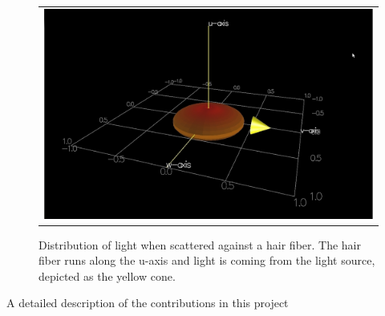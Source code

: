 \documentclass[11pt,a4paper]{report}
\begin{document}
\begin{figure}
\begin{tabular}{c}
\includegraphics[scale=0.2]{images/strands1_colorR.jpg} \\
\end{tabular}

\caption{Distribution of light when scattered against a hair fiber. The hair fiber runs along the u-axis and light is coming from the light source, depicted as the yellow cone.}
\label{visual_light_distribution}

\end{figure}



A detailed description of the contributions in this project
\end{document}
